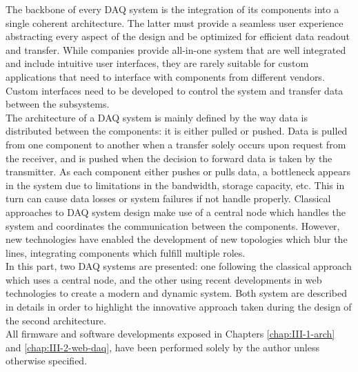 The backbone of every DAQ system is the integration of its components into a single coherent architecture. The latter must provide a seamless user experience abstracting every aspect of the design and be optimized for efficient data readout and transfer. While companies provide all-in-one system that are well integrated and include intuitive user interfaces, they are rarely suitable for custom applications that need to interface with components from different vendors. Custom interfaces need to be developed to control the system and transfer data between the subsystems. \\

The architecture of a DAQ system is mainly defined by the way data is distributed between the components: it is either pulled or pushed. Data is pulled from one component to another when a transfer solely occurs upon request from the receiver, and is pushed when the decision to forward data is taken by the transmitter. As each component either pushes or pulls data, a bottleneck appears in the system due to limitations in the bandwidth, storage capacity, etc. This in turn can cause data losses or system failures if not handle properly. Classical approaches to DAQ system design make use of a central node which handles the system and coordinates the communication between the components. However, new technologies have enabled the development of new topologies which blur the lines, integrating components which fulfill multiple roles. \\

In this part, two DAQ systems are presented: one following the classical approach which uses a central node, and the other using recent developments in web technologies to create a modern and dynamic system. Both system are described in details in order to highlight the innovative approach taken during the design of the second architecture. \\

All firmware and software developments exposed in Chapters \ref{chap:III-1-arch} and \ref{chap:III-2-web-daq}, have been performed solely by the author unless otherwise specified.
